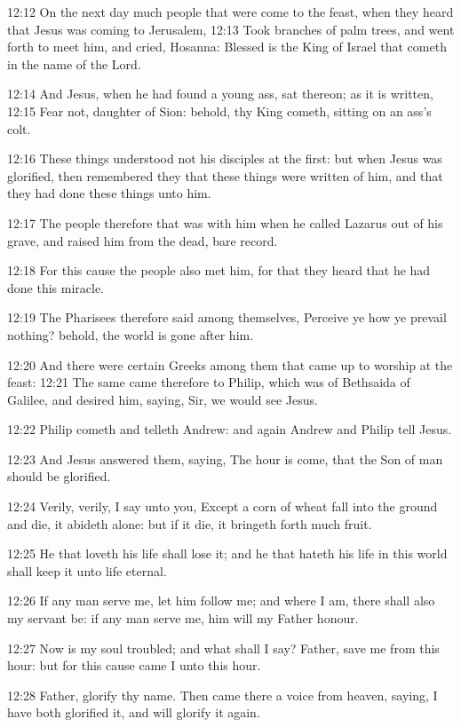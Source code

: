 12:12 On the next day much people that were come to the feast, when they heard that Jesus was coming to Jerusalem, 12:13 Took branches of palm trees, and went forth to meet him, and cried, Hosanna: Blessed is the King of Israel that cometh in the name of the Lord.

12:14 And Jesus, when he had found a young ass, sat thereon; as it is written, 12:15 Fear not, daughter of Sion: behold, thy King cometh, sitting on an ass's colt.

12:16 These things understood not his disciples at the first: but when Jesus was glorified, then remembered they that these things were written of him, and that they had done these things unto him.

12:17 The people therefore that was with him when he called Lazarus out of his grave, and raised him from the dead, bare record.

12:18 For this cause the people also met him, for that they heard that he had done this miracle.

12:19 The Pharisees therefore said among themselves, Perceive ye how ye prevail nothing? behold, the world is gone after him.

12:20 And there were certain Greeks among them that came up to worship at the feast: 12:21 The same came therefore to Philip, which was of Bethsaida of Galilee, and desired him, saying, Sir, we would see Jesus.

12:22 Philip cometh and telleth Andrew: and again Andrew and Philip tell Jesus.

12:23 And Jesus answered them, saying, The hour is come, that the Son of man should be glorified.

12:24 Verily, verily, I say unto you, Except a corn of wheat fall into the ground and die, it abideth alone: but if it die, it bringeth forth much fruit.

12:25 He that loveth his life shall lose it; and he that hateth his life in this world shall keep it unto life eternal.

12:26 If any man serve me, let him follow me; and where I am, there shall also my servant be: if any man serve me, him will my Father honour.

12:27 Now is my soul troubled; and what shall I say? Father, save me from this hour: but for this cause came I unto this hour.

12:28 Father, glorify thy name. Then came there a voice from heaven, saying, I have both glorified it, and will glorify it again.

